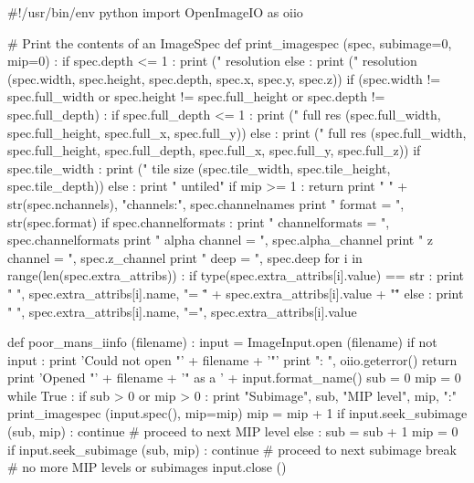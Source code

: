 \begin{tinycode}
#!/usr/bin/env python 
import OpenImageIO as oiio

# Print the contents of an ImageSpec
def print_imagespec (spec, subimage=0, mip=0) :
    if spec.depth <= 1 :
        print ("  resolution %
    else :
        print ("  resolution %
               (spec.width, spec.height, spec.depth, spec.x, spec.y, spec.z))
    if (spec.width != spec.full_width or spec.height != spec.full_height
        or spec.depth != spec.full_depth) :
        if spec.full_depth <= 1 :
            print ("  full res   %
                   (spec.full_width, spec.full_height, spec.full_x, spec.full_y))
        else :
            print ("  full res   %
                   (spec.full_width, spec.full_height, spec.full_depth,
                    spec.full_x, spec.full_y, spec.full_z))
    if spec.tile_width :
        print ("  tile size  %
               (spec.tile_width, spec.tile_height, spec.tile_depth))
    else :
        print "  untiled"
    if mip >= 1 :
        return
    print "  " + str(spec.nchannels), "channels:", spec.channelnames
    print "  format = ", str(spec.format)
    if spec.channelformats :
        print "  channelformats = ", spec.channelformats
    print "  alpha channel = ", spec.alpha_channel
    print "  z channel = ", spec.z_channel
    print "  deep = ", spec.deep
    for i in range(len(spec.extra_attribs)) :
        if type(spec.extra_attribs[i].value) == str :
            print " ", spec.extra_attribs[i].name, "= \"" + spec.extra_attribs[i].value + "\""
        else :
            print " ", spec.extra_attribs[i].name, "=", spec.extra_attribs[i].value


def poor_mans_iinfo (filename) :
    input = ImageInput.open (filename)
    if not input :
        print 'Could not open "' + filename + '"'
        print "\tError: ", oiio.geterror()
        return
    print 'Opened "' + filename + '" as a ' + input.format_name()
    sub = 0
    mip = 0
    while True :
        if sub > 0 or mip > 0 :
            print "Subimage", sub, "MIP level", mip, ":"
        print_imagespec (input.spec(), mip=mip)
        mip = mip + 1
        if input.seek_subimage (sub, mip) :
            continue    # proceed to next MIP level
        else :
            sub = sub + 1
            mip = 0
            if input.seek_subimage (sub, mip) :
                continue    # proceed to next subimage
        break  # no more MIP levels or subimages
    input.close ()
\end{tinycode}


